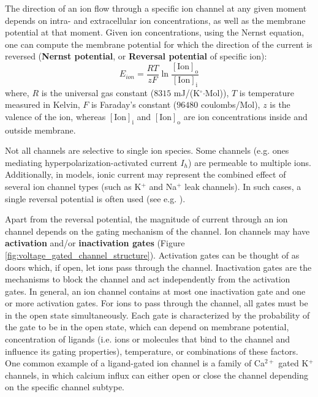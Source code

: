 \documentclass[../main.tex]{subfiles}
\begin{document}
The direction of an ion flow through a specific ion channel at any given moment depends on intra- and extracellular ion concentrations, as well as the membrane potential at that moment. Given ion concentrations, using the Nernst equation, one can compute the membrane potential for which the direction of the current is reversed \parencite{izhikevichDynamicalSystemsNeuroscience2006} (\textbf{Nernst potential}, or \textbf{Reversal potential} of specific ion):
\begin{equation}\label{eq:nernst_equation}
    E_{ion} = \frac{RT}{zF} \ln \frac{[\text{Ion}]_{\text{o}}}{[\text{Ion}]_{\text{i}}}
\end{equation}
where, $R$ is the universal gas constant ($8315$ mJ/(K$^\circ$$\cdot$Mol)), $T$ is temperature measured in Kelvin, $F$ is Faraday's constant ($96480$ coulombs/Mol), $z$ is the valence of the ion, whereas $[\text{Ion}]_{\text{i}}$ and $[\text{Ion}]_{\text{o}}$ are ion concentrations inside and outside membrane.

Not all channels are selective to single ion species. Some channels (e.g. ones mediating hyperpolarization-activated current $I_h$) are permeable to multiple ions. Additionally, in models, ionic current may represent the combined effect of several ion channel types (such as K$^+$ and Na$^+$ leak channels). In such cases, a single reversal potential is often used (see e.g. \parencite{wangMultipleDynamicalModes1994}).

Apart from the reversal potential, the magnitude of current through an ion channel depends on the gating mechanism of the channel. Ion channels may have \textbf{activation} and/or \textbf{inactivation gates} (Figure \ref{fig:voltage_gated_channel_structure}). Activation gates can be thought of as doors which, if open, let ions pass through the channel. Inactivation gates are the mechanisms to block the channel and act independently from the activation gates. In general, an ion channel contains at most one inactivation gate and one or more activation gates. For ions to pass through the channel, all gates must be in the open state simultaneously. Each gate is characterized by the probability of the gate to be in the open state, which can depend on membrane potential, concentration of ligands (i.e. ions or molecules that bind to the channel and influence its gating properties), temperature, or combinations of these factors. One common example of a ligand-gated ion channel is a family of Ca$^{2+}$ gated K$^+$ channels, in which calcium influx can either open or close the channel depending on the specific channel subtype.
\end{document}
